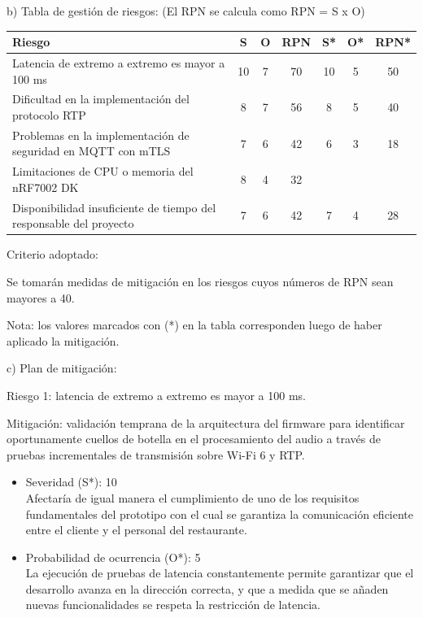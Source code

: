 \documentclass[
11pt, %
]{charter}
\begin{document}
b) Tabla de gestión de riesgos: (El RPN se calcula como RPN = S x O)

\begin{table}[htpb]
	\centering
	\begin{tabularx}{\linewidth}{@{}|X|c|c|c|c|c|c|@{}}
		\hline
		\rowcolor[HTML]{C0C0C0} 
		Riesgo & S & O & RPN & S* & O* & RPN* \\ \hline
		Latencia de extremo a extremo es mayor a 100 ms & 10  & 7  & 70 & 10 & 5 & 50     \\ \hline
		Dificultad en la implementación del protocolo RTP & 8  & 7  & 56 & 8 & 5   & 40     \\ \hline
		Problemas en la implementación de seguridad en MQTT con mTLS & 7  & 6  & 42    & 6  & 3   & 18     \\ \hline
		Limitaciones de CPU o memoria del nRF7002 DK & 8  & 4  & 32    &    &    &      \\ \hline
		Disponibilidad insuficiente de tiempo del responsable del proyecto
		& 7  & 6  & 42  & 7   & 4   & 28     \\ \hline
	\end{tabularx}%
\end{table}
Criterio adoptado:

Se tomarán medidas de mitigación en los riesgos cuyos números de RPN sean mayores a 40.

Nota: los valores marcados con (*) en la tabla corresponden luego de haber aplicado la mitigación.

c) Plan de mitigación:

Riesgo 1: latencia de extremo a extremo es mayor a 100 ms.

Mitigación: validación temprana de la arquitectura del firmware para identificar oportunamente cuellos de botella en el procesamiento del audio a través de pruebas incrementales de transmisión sobre Wi-Fi 6 y RTP.

\begin{itemize}
	\item Severidad (S*): 10 \\
	Afectaría de igual manera el cumplimiento de uno de los requisitos fundamentales del prototipo con el cual se garantiza la comunicación eficiente entre el cliente y el personal del restaurante.
	\item Probabilidad de ocurrencia (O*): 5 \\
	La ejecución de pruebas de latencia constantemente permite garantizar que el desarrollo avanza en la dirección correcta, y que a medida que se añaden nuevas funcionalidades se respeta la restricción de latencia.
\end{itemize}
\end{document}
